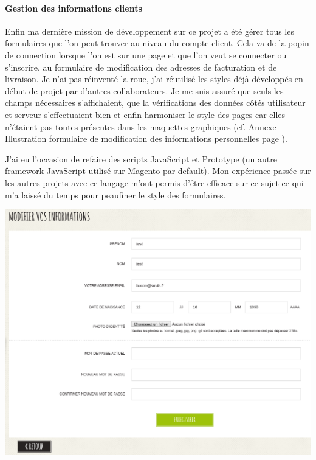 \documentclass[a4paper,11pt,twoside]{report}
\begin{document}
    	\paragraph*{Gestion des informations clients}
    	Enfin ma dernière mission de développement sur ce projet a été gérer tous les formulaires que l'on peut trouver au niveau du compte client. Cela va de la popin de connection lorsque l'on est sur une page et que l'on veut se connecter ou s'inscrire, au formulaire de modification des adresses de facturation et de livraison. Je n'ai pas réinventé la roue, j'ai réutilisé les styles déjà développés en début de projet par d'autres collaborateurs. Je me suis assuré que seuls les champs nécessaires s'affichaient, que la vérifications des données côtés utilisateur et serveur s'effectuaient bien et enfin harmoniser le style des pages car elles n'étaient pas toutes présentes dans les maquettes graphiques (cf. Annexe Illustration formulaire de modification des informations personnelles page \pageref{SL_account_information_form}).
	
	J'ai eu l'occasion de refaire des scripts JavaScript et Prototype (un autre framework JavaScript utilisé sur Magento par default). Mon expérience passée sur les autres projets avec ce langage m'ont permis d'être efficace sur ce sujet ce qui m'a laissé du temps pour peaufiner le style des formulaires. 
	
	\begin{center}
	  \includegraphics[width=\textwidth]{images/SL_account_information_form.png} 
	  \label{SL_account_information_form}
	\end{center}
\end{document}
